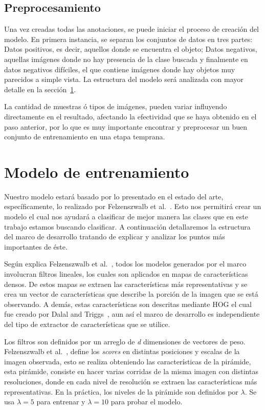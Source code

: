 \subsection{Preprocesamiento}
Una vez creadas todas las anotaciones, se puede iniciar el proceso de creación del modelo. En primera instancia, se separan los conjuntos de datos en tres partes: Datos positivos, es decir, aquellos donde se encuentra el objeto; Datos negativos, aquellas imágenes donde no hay presencia de la clase buscada y finalmente en datos negativos difíciles, el que contiene imágenes donde hay objetos muy parecidos a simple vista. La estructura del modelo será analizada con mayor detalle en la sección~\ref{sec:model}.

La cantidad de muestras ó tipos de imágenes, pueden variar influyendo directamente en el resultado, afectando la efectividad que se haya obtenido en el paso anterior, por lo que es muy importante encontrar y preprocesar un buen conjunto de entrenamiento en una etapa temprana.


\section{Modelo de entrenamiento}
\label{sec:model}
Nuestro modelo estará basado por lo presentado en el estado del arte, específicamente, lo realizado por Felzenszwalb et al.~\cite{Felzenszwalb2010}. Esto nos permitirá crear un modelo el cual nos ayudará a clasificar de mejor manera las clases que en este trabajo estamos buscando clasificar. A continuación detallaremos la estructura del marco de desarrollo tratando de explicar y analizar los puntos más importantes de éste.

Según explica Felzenszwalb et al.~\cite{Felzenszwalb2010}, todos los modelos generados por el marco involucran filtros lineales, los cuales son aplicados en mapas de características densos. De estos mapas se extraen las características más representativas y se crea un vector de características que describe la porción de la imagen que se está observando. A demás, estas características son descritas mediante HOG el cual fue creado por Dalal and Triggs~\cite{Dalal2005}, aun así el marco de desarrollo es independiente del tipo de extractor de características que se utilice.

Los filtros son definidos por un arreglo de \textit{d} dimensiones de vectores de peso. Felzenszwalb et al.~\cite{Felzenszwalb2010}, define los \textit{scores} en distintas posiciones y escalas de la imagen observada, esto se realiza obteniendo las características de la pirámide, esta pirámide, consiste en hacer varias corridas de la misma imagen con distintas resoluciones, donde en cada nivel de resolución se extraen las características más representativas. En la práctica, los niveles de la pirámide son definidos por $\lambda$. Se usa $\lambda = 5$ para entrenar y $\lambda = 10$ para probar el modelo.

